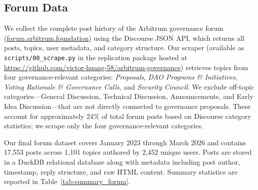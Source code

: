 \documentclass[12pt]{article}
\begin{document}

\subsection{Forum Data}

\begin{sloppypar}
We collect the complete post history of the Arbitrum governance forum
(\href{https://forum.arbitrum.foundation}{\mbox{forum.arbitrum.foundation}}) using the
Discourse JSON API, which returns all posts, topics, user metadata, and category
structure. Our scraper (available as \texttt{scripts/00\_scrape.py} in the replication
package hosted at \url{https://github.com/victor-huang-58/arbitrum-governance}) retrieves topics from four governance-relevant
categories: \emph{Proposals}, \emph{DAO Programs \& Initiatives}, \emph{Voting
Rationale \& Governance Calls}, and \emph{Security Council}. We exclude
off-topic categories---General Discussion, Technical Discussion, Announcements,
and Early Idea Discussion---that are not directly connected to governance proposals.
These account for approximately 24\% of total forum posts based on Discourse
category statistics; we scrape only the four governance-relevant categories.
\end{sloppypar}

Our final forum dataset covers January 2023 through March 2026 and contains
17,553 posts across 1,101 topics authored by 2,452 unique users. Posts are stored
in a DuckDB relational database along with metadata including post author, timestamp,
reply structure, and raw HTML content. Summary statistics are reported in
Table~\ref{tab:summary_forum}.
\end{document}
